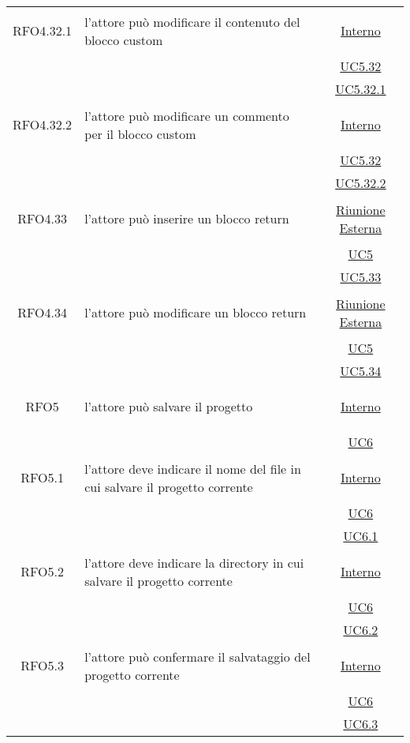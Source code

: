 \begin{longtable}{|c|>{\centering}m{7cm}|c|}
\hypertarget{RFO4.32.1}{RFO4.32.1} & l'attore può modificare il contenuto del blocco custom & \hyperlink{Interno}{Interno}\\
& &\hyperref[UC5.32]{UC5.32}\\
& &\hyperref[UC5.32.1]{UC5.32.1}\\ \hline

\hypertarget{RFO4.32.2}{RFO4.32.2} & l'attore può modificare un commento per il blocco custom & \hyperlink{Interno}{Interno}\\
& &\hyperref[UC5.32]{UC5.32}\\
& &\hyperref[UC5.32.2]{UC5.32.2}\\ \hline
\hypertarget{RFO4.33}{RFO4.33} & l'attore può inserire un blocco return & \hyperlink{Riunione Esterna}{Riunione Esterna}\\
& &\hyperref[UC5]{UC5}\\
& &\hyperref[UC5.33]{UC5.33}\\ \hline

\hypertarget{RFO4.34}{RFO4.34} & l'attore può modificare un blocco return & \hyperlink{Riunione Esterna}{Riunione Esterna}\\
& &\hyperref[UC5]{UC5}\\
& &\hyperref[UC5.34]{UC5.34}\\ \hline

\hypertarget{RFO5}{RFO5} & l'attore può salvare il progetto &  \hyperlink{Interno}{Interno}\\
& & \hyperref[UC6]{UC6}\\ \hline

\hypertarget{RFO5.1}{RFO5.1} & l'attore deve indicare il nome del file in cui salvare il progetto corrente&  \hyperlink{Interno}{Interno}\\
& & \hyperref[UC6]{UC6}\\
& & \hyperref[UC6.1]{UC6.1}\\ \hline

\hypertarget{RFO5.2}{RFO5.2} & l'attore deve indicare la directory in cui salvare il progetto corrente&  \hyperlink{Interno}{Interno}\\
& & \hyperref[UC6]{UC6}\\
& & \hyperref[UC6.2]{UC6.2}\\ \hline

\hypertarget{RFO5.3}{RFO5.3} & l'attore può confermare il salvataggio del progetto corrente &  \hyperlink{Interno}{Interno}\\
& & \hyperref[UC6]{UC6}\\
& & \hyperref[UC6.3]{UC6.3}\\ \hline


\end{longtable}

